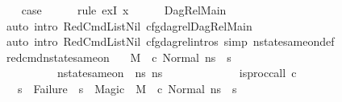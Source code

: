 \begin{isabellebody}
\ \ \isamarkupfalse%
\ {\isacharquery}{\kern0pt}case\isanewline
\ \ \ \ \isamarkupfalse%
\ {\isacharparenleft}{\kern0pt}rule\ exI{\isacharbrackleft}{\kern0pt}\ {\isacharquery}{\kern0pt}x{\isacharequal}{\kern0pt}{\isachardoublequoteopen}{\isacharbrackleft}{\kern0pt}{\isacharbrackright}{\kern0pt}{\isachardoublequoteclose}{\isacharbrackright}{\kern0pt}{\isacharparenright}{\kern0pt}\isanewline
\ \ \ \ \isamarkupfalse%
\ DagRel{\isacharunderscore}{\kern0pt}Main\isanewline
\ \ \ \ \ \ \isamarkupfalse%
\ {\isacharparenleft}{\kern0pt}auto\ intro{\isacharcolon}{\kern0pt}\ RedCmdListNil\ cfg{\isacharunderscore}{\kern0pt}dag{\isacharunderscore}{\kern0pt}rel{\isachardot}{\kern0pt}DagRel{\isacharunderscore}{\kern0pt}Main{\isacharparenright}{\kern0pt}\isanewline
{}\isamarkupfalse%
\ {\isacharparenleft}{\kern0pt}auto\ intro{\isacharcolon}{\kern0pt}\ RedCmdListNil\ cfg{\isacharunderscore}{\kern0pt}dag{\isacharunderscore}{\kern0pt}rel{\isachardot}{\kern0pt}intros\ simp{\isacharcolon}{\kern0pt}\ nstate{\isacharunderscore}{\kern0pt}same{\isacharunderscore}{\kern0pt}on{\isacharunderscore}{\kern0pt}def{\isacharparenright}{\kern0pt}%
\endisatagproof
{\isafoldproof}%
%
\isadelimproof
\isanewline
%
\endisadelimproof
\isanewline
{}\isamarkupfalse%
\ red{\isacharunderscore}{\kern0pt}cmd{\isacharunderscore}{\kern0pt}nstate{\isacharunderscore}{\kern0pt}same{\isacharunderscore}{\kern0pt}on{\isacharcolon}{\kern0pt}\isanewline
\ \ \ {\isachardoublequoteopen}M{\isacharcomma}{\kern0pt}{\isasymLambda}{\isacharcomma}{\kern0pt}{\isasymGamma}{\isacharcomma}{\kern0pt}{\isasymOmega}\ {\isasymturnstile}\ {\isasymlangle}c{\isacharcomma}{\kern0pt}\ Normal\ ns{}{\isasymrangle}\ {\isasymrightarrow}\ s{\isacharprime}{\kern0pt}{\isachardoublequoteclose}\ \isanewline
\ \ \ \ \ \ \ \ \ \ {\isachardoublequoteopen}nstate{\isacharunderscore}{\kern0pt}same{\isacharunderscore}{\kern0pt}on\ {\isasymLambda}\ ns{}\ ns{}\ {\isacharbraceleft}{\kern0pt}{\isacharbraceright}{\kern0pt}{\isachardoublequoteclose}\ \isanewline
\ \ \ \ \ \ \ \ \ \ {\isachardoublequoteopen}{\isasymnot}\ {\isacharparenleft}{\kern0pt}is{\isacharunderscore}{\kern0pt}proc{\isacharunderscore}{\kern0pt}call\ c{\isacharparenright}{\kern0pt}{\isachardoublequoteclose}\isanewline
\ \ \ {\isachardoublequoteopen}{\isacharparenleft}{\kern0pt}{\isacharparenleft}{\kern0pt}{\isacharparenleft}{\kern0pt}s{\isacharprime}{\kern0pt}\ {\isacharequal}{\kern0pt}\ Failure{\isacharparenright}{\kern0pt}\ {\isasymor}\ {\isacharparenleft}{\kern0pt}s{\isacharprime}{\kern0pt}\ {\isacharequal}{\kern0pt}\ Magic{\isacharparenright}{\kern0pt}{\isacharparenright}{\kern0pt}\ {\isasymlongrightarrow}\ M{\isacharcomma}{\kern0pt}{\isasymLambda}{\isacharcomma}{\kern0pt}{\isasymGamma}{\isacharcomma}{\kern0pt}{\isasymOmega}\ {\isasymturnstile}\ {\isasymlangle}c{\isacharcomma}{\kern0pt}\ Normal\ ns{}{\isasymrangle}\ {\isasymrightarrow}\ s{\isacharprime}{\kern0pt}{\isacharparenright}{\kern0pt}\ {\isasymand}\isanewline

\end{isabellebody}
